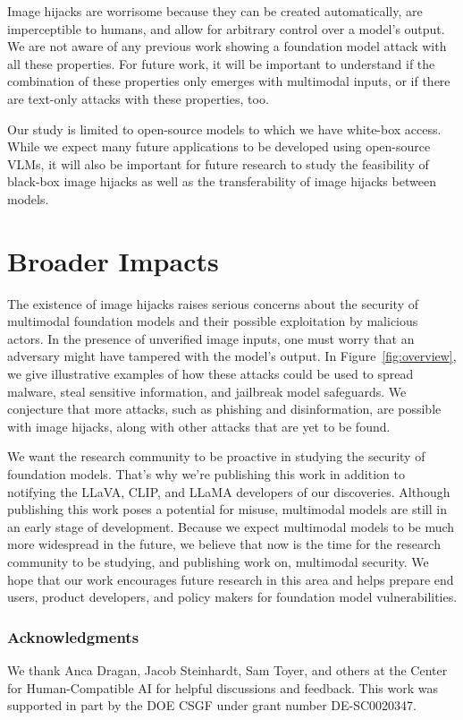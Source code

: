 \documentclass{article} %
\def\figref#1{Figure~\ref{#1}}
\begin{document}
Image hijacks are worrisome because they can be created automatically, are imperceptible to humans, and allow for arbitrary control over a model's output. We are not aware of any previous work showing a foundation model attack with all these properties. For future work, it will be important to understand if the combination of these properties only emerges with multimodal inputs, or if there are text-only attacks with these properties, too.

Our study is limited to open-source models to which we have white-box access. While we expect many future applications to be developed using open-source VLMs, it will also be important for future research to study the feasibility of black-box image hijacks as well as the transferability of image hijacks between models.

\section{Broader Impacts}

The existence of image hijacks raises serious concerns about the security of multimodal foundation models and their possible exploitation by malicious actors. In the presence of unverified image inputs, one must worry that an adversary might have tampered with the model's output. In \figref{fig:overview}, we give illustrative examples of how these attacks could be used to spread malware, steal sensitive information, and jailbreak model safeguards. We conjecture that more attacks, such as phishing and disinformation, are possible with image hijacks, along with other attacks that are yet to be found.

We want the research community to be proactive in studying the security of foundation models. That's why we're publishing this work in addition to notifying the LLaVA, CLIP, and LLaMA developers of our discoveries. Although publishing this work poses a potential for misuse, multimodal models are still in an early stage of development. Because we expect multimodal models to be much more widespread in the future, we believe that now is the time for the research community to be studying, and publishing work on, multimodal security. We hope that our work encourages future research in this area and helps prepare end users, product developers, and policy makers for foundation model vulnerabilities.%





\subsubsection*{Acknowledgments}

We thank Anca Dragan, Jacob Steinhardt, Sam Toyer, and others at 
the Center for Human-Compatible AI for helpful discussions and feedback. This work was supported in part by the DOE CSGF under grant number DE-SC0020347.



\end{document}

